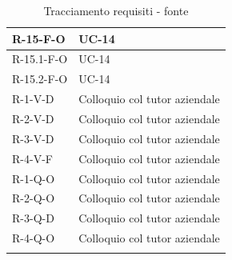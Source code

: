 \begin{center}
\begin{longtable}{| C{6cm} |C{6cm}|}
        R-15-F-O & UC-14\\\hline
        R-15.1-F-O & UC-14\\\hline
        R-15.2-F-O & UC-14\\\hline
        R-1-V-D& Colloquio col tutor aziendale\\\hline
        R-2-V-D& Colloquio col tutor aziendale\\\hline
        R-3-V-D& Colloquio col tutor aziendale\\\hline
        R-4-V-F& Colloquio col tutor aziendale\\\hline
        R-1-Q-O& Colloquio col tutor aziendale\\\hline
        R-2-Q-O& Colloquio col tutor aziendale\\\hline
        R-3-Q-D& Colloquio col tutor aziendale\\\hline
        R-4-Q-O& Colloquio col tutor aziendale\\\hline
        \caption{Tracciamento requisiti - fonte}
    \end{longtable}
\end{center}